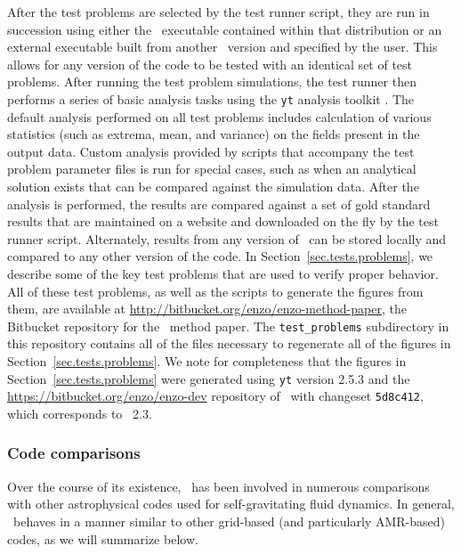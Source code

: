After the test problems are selected by the test runner script, they
are run in succession using either the \enzo\ executable contained
within that distribution or an external executable built from another
\enzo\ version and specified by the user.  This allows for any version
of the code to be tested with an identical set of test problems.
After running the test problem simulations, the test runner then
performs a series of basic analysis tasks using the \texttt{yt}
analysis toolkit \citep{2011ApJS..192....9T, 2011arXiv1112.4482T}.
The default analysis performed on all test problems includes
calculation of various statistics (such as extrema, mean, and
variance) on the fields present in the output data.  Custom analysis
provided by scripts that accompany the test problem parameter files is
run for special cases, such as when an analytical solution exists that
can be compared against the simulation data.  After the analysis is
performed, the results are compared against a set of gold standard
results that are maintained on a website and downloaded on the fly by
the test runner script.  Alternately, results from any version of
\enzo\ can be stored locally and compared to any other version of the
code.  In Section~\ref{sec.tests.problems}, we describe some of the
key test problems that are used to verify proper behavior.  All of
these test problems, as well as the scripts to generate the figures
from them, are available at
\url{http://bitbucket.org/enzo/enzo-method-paper}, the Bitbucket
repository for the \enzo\ method paper.  The \texttt{test\_problems}
subdirectory in this repository contains all of the files necessary to
regenerate all of the figures in Section~\ref{sec.tests.problems}.  We
note for completeness that the figures in
Section~\ref{sec.tests.problems} were generated using \texttt{yt}
version 2.5.3 and the \url{https://bitbucket.org/enzo/enzo-dev}
repository of \enzo\ with changeset \texttt{5d8c412}, which
corresponds to \enzo\ 2.3.

\subsubsection{Code comparisons}
\label{sec.tests.compare}

Over the course of its existence, \enzo\ has been involved in numerous
comparisons with other astrophysical codes used for self-gravitating
fluid dynamics.  In general, \enzo\ behaves in a manner similar to
other grid-based (and particularly AMR-based) codes, as we will
summarize below.

